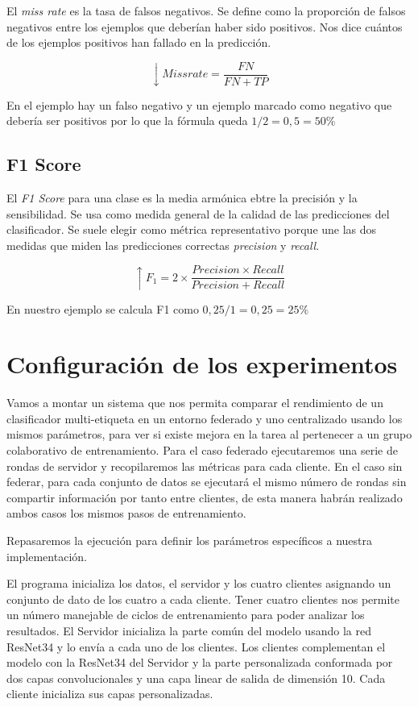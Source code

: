 El \textit{miss rate} es la tasa de falsos negativos. Se define como la proporción de falsos negativos entre los ejemplos que deberían haber sido positivos. Nos dice cuántos de los ejemplos positivos han fallado en la predicción.

\[\downarrow Miss rate = \frac{FN}{FN + TP}\]

En el ejemplo hay un falso negativo y un ejemplo marcado como negativo que debería ser positivos por lo que la fórmula queda \(1 / 2 = 0,5 = 50\%\)

\subsection{F1 Score}

El \textit{F1 Score} para una clase es la media armónica ebtre la precisión y la sensibilidad. Se usa como medida general de la calidad de las predicciones del clasificador. Se suele elegir como métrica representativo porque une las dos medidas que miden las predicciones correctas \textit{precision} y \textit{recall}.

\[\uparrow F_1 = 2 \times \frac{Precision \times Recall}{Precision + Recall}\]

En nuestro ejemplo se calcula F1 como \(0,25 / 1 = 0,25 = 25\%\)

\section{Configuración de los experimentos}

Vamos a montar un sistema que nos permita comparar el rendimiento de un clasificador multi-etiqueta en un entorno federado y uno centralizado usando los mismos parámetros, para ver si existe mejora en la tarea al pertenecer a un grupo colaborativo de entrenamiento. Para el caso federado ejecutaremos una serie de rondas de servidor y recopilaremos las métricas para cada cliente. En el caso sin federar, para cada conjunto de datos se ejecutará el mismo número de rondas sin compartir información por tanto entre clientes, de esta manera habrán realizado ambos casos los mismos pasos de entrenamiento.

Repasaremos la ejecución para definir los parámetros específicos a nuestra implementación.

El programa inicializa los datos, el servidor y los cuatro clientes asignando un conjunto de dato de los cuatro a cada cliente. Tener cuatro clientes nos permite un número manejable de ciclos de entrenamiento para poder analizar los resultados. El Servidor inicializa la parte común del modelo usando la red ResNet34 y lo envía a cada uno de los clientes. Los clientes complementan el modelo con la ResNet34 del Servidor y la parte personalizada conformada por dos capas convolucionales y una capa linear de salida de dimensión 10. Cada cliente inicializa sus capas personalizadas.

